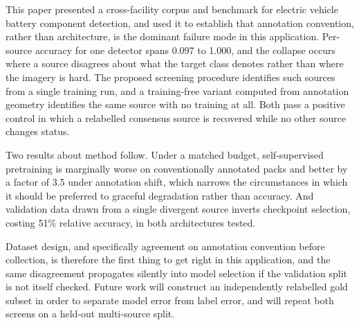 \documentclass[conference]{IEEEtran}
\newif\ifanon\anontrue
\begin{document}
This paper presented a cross-facility corpus and benchmark for electric vehicle
battery component detection, and used it to establish that annotation convention,
rather than architecture, is the dominant failure mode in this application.
Per-source accuracy for one detector spans 0.097 to 1.000, and the collapse occurs
where a source disagrees about what the target class denotes rather than where the
imagery is hard. The proposed screening procedure identifies such sources from a
single training run, and a training-free variant computed from annotation geometry
identifies the same source with no training at all. Both pass a positive control in
which a relabelled consensus source is recovered while no other source changes status.

Two results about method follow. Under a matched budget, self-supervised pretraining
is marginally worse on conventionally annotated packs and better by a factor of 3.5
under annotation shift, which narrows the circumstances in which it should be
preferred to graceful degradation rather than accuracy. And validation data drawn from
a single divergent source inverts checkpoint selection, costing 51\% relative
accuracy, in both architectures tested.

Dataset design, and specifically agreement on annotation convention before collection,
is therefore the first thing to get right in this application, and the same
disagreement propagates silently into model selection if the validation split is not
itself checked. Future work will construct an independently relabelled gold subset in
order to separate model error from label error, and will repeat both screens on a
held-out multi-source split.

\ifanon\else
\section*{Acknowledgements}
The authors thank the RESCu-M2 research hub at the University of Birmingham, and
Prof. Samia Nefti-Meziani for her leadership of it, for supporting this work and
providing access to the EV battery disassembly facility.
\fi
\end{document}
